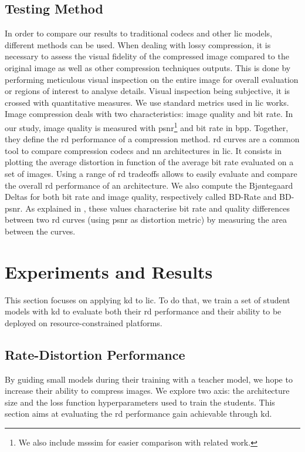 \documentclass{article}
\begin{document}
\subsection{Testing Method}
In order to compare our results to traditional codecs and other \acrshort{lic} models, different methods can be used. When dealing with lossy compression, it is necessary to assess the visual fidelity of the compressed image compared to the original image as well as other compression techniques outputs. This is done by performing meticulous visual inspection on the entire image for overall evaluation or regions of interest to analyse details. Visual inspection being subjective, it is crossed with quantitative measures. We use standard metrics used in \acrshort{lic} works. Image compression deals with two characteristics: image quality and bit rate. In our study, image quality is measured with \acrshort{psnr}\footnote{We also include \acrfull{msssim} for easier comparison with related work.} and bit rate in \acrfull{bpp}. Together, they define the \acrshort{rd} performance of a compression method. \acrshort{rd} curves are a common tool to compare compression codecs and \acrshort{nn} architectures in \acrshort{lic}. It consists in plotting the average distortion in function of the average bit rate evaluated on a set of images. Using a range of \acrshort{rd} tradeoffs allows to easily evaluate and compare the overall \acrshort{rd} performance of an architecture. We also compute the Bjøntegaard Deltas for both bit rate and image quality, respectively called BD-Rate and BD-\acrshort{psnr}. As explained in \cite{barman2024bjontegaarddeltabdtutorial}, these values characterise bit rate and quality differences between two \acrshort{rd} curves (using \acrshort{psnr} as distortion metric) by measuring the area between the curves.

\section{Experiments and Results}
\label{experiments_and_results}
This section focuses on applying \acrshort{kd} to \acrshort{lic}. To do that, we train a set of student models with \acrshort{kd} to evaluate both their \acrshort{rd} performance and their ability to be deployed on resource-constrained platforms.

\subsection{Rate-Distortion Performance}
By guiding small models during their training with a teacher model, we hope to increase their ability to compress images. We explore two axis: the architecture size and the loss function hyperparameters used to train the students. This section aims at evaluating the \acrshort{rd} performance gain achievable through \acrshort{kd}.
\end{document}
